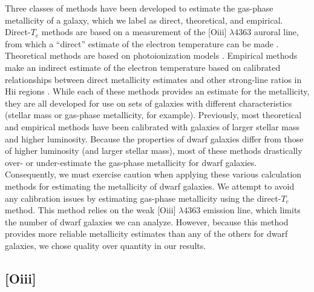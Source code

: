 Three classes of methods have been developed to estimate the gas-phase 
metallicity of a galaxy, which we label as direct, theoretical, and empirical.  
Direct-$T_e$ methods are based on a measurement of the [O{\sc iii}] 
$\lambda 4363$ auroral line, from which a ``direct'' estimate of the electron 
temperature can be made \citep[e.g.,][]{Izotov06, Kniazev08, Pilyugin07, Yin07}.  
Theoretical methods are based on photoionization models 
\citep[e.g.,][]{Kewley02}.  Empirical methods make an indirect estimate of the 
electron temperature based on calibrated relationships between direct 
metallicity estimates and other strong-line ratios in H{\sc ii} regions 
\citep[see, for example,][]{Pettini04, Pilyugin11, Dopita13, LaraLopez13, 
Marino13}.  While each of these methods provides an estimate for the 
metallicity, they are all developed for use on sets of galaxies with different 
characteristics (stellar mass or gas-phase metallicity, for example).  
Previously, most theoretical and empirical methods have been calibrated with 
galaxies of larger stellar mass and higher luminosity.  Because the properties 
of dwarf galaxies differ from those of higher luminosity (and larger stellar 
mass), most of these methods drastically over- or under-estimate the gas-phase 
metallicity for dwarf galaxies.  Consequently, we must exercise caution when 
applying these various calculation methods for estimating the metallicity of 
dwarf galaxies.  We attempt to avoid any calibration issues by estimating 
gas-phase metallicity using the direct-$T_e$ method.  This method relies on the 
weak [O{\sc iii}] $\lambda 4363$ emission line, which limits the number of dwarf 
galaxies we can analyze.  However, because this method provides more reliable 
metallicity estimates than any of the others for dwarf galaxies, we chose 
quality over quantity in our results.

\subsection{[O{\sc iii}]}\label{sec:O3}

